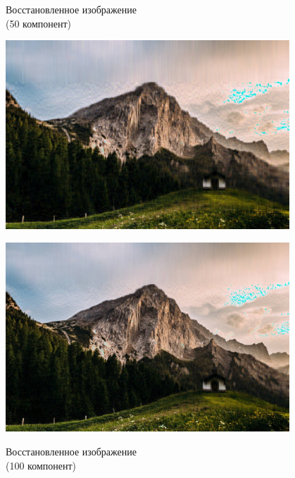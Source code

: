 \documentclass[a4paper]{article}
\begin{document}
\begin{figure}[H]
\centering
    \begin{minipage}{.45\textwidth}
    \caption{Восстановленное изображение \\(50 компонент)}
    \includegraphics[width = 0.95\textwidth]{reconstructions/with_50comps_Austria.jpg}
    \label{fig:aus_50}
    \end{minipage}%
    \begin{minipage}{.45\textwidth}
      \centering
    \caption{Восстановленное изображение \\(100 компонент)}
    \includegraphics[width = 0.95\textwidth]{reconstructions/with_100comps_Austria.jpg}
    \label{fig:aus_100}
    \end{minipage}%
\end{figure}
\end{document}
